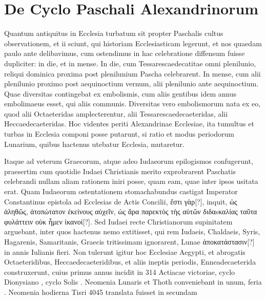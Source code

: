 \section{De Cyclo Paschali Alexandrinorum}
%
Quantum antiquitus in Ecclesia turbatum sit propter Paschalis
cultus observationem, et ii sciunt, qui historiam Ecclesiasticam
legerunt, et nos quaedam paulo ante delibavimus, cum
ostendimus in hac celebratione diffensum fuisse dupliciter: in die, et
in mense.
In die, cum Tessarescaedecatitae omni plenilunio, reliqui
dominica proxima post plenilunium Pascha celebrarent.
In mense,
cum alii plenilunio proximo post aequinoctium vernum, alii plenilunio
ante aequinoctium.
Quae diversitas contingebat ex embolismis,
cum aliis gentibus idem annus embolimaeus esset, qui aliis communis.
Diversitas vero embolismorum nata ex eo, quod alii Octaeteridas
amplecterentur, alii Tessarescaedecaeteridas, alii Heccaedecaeteridas.
Hoc videntes periti Alexandrinae Ecclesiae, ita tumultus et
turbas in Ecclesia componi posse putarunt, si ratio et modus periodorum
Lunarium, quibus hactenus utebatur Ecclesia, mutaretur.
%
\begin{table}[tb]
  
\end{table}
%
Itaque
ad veterum Graecorum, atque adeo Iudaeorum epilogismos confugerunt,
praesertim cum quotidie Iudaei
Christianis merito exprobrarent Paschatis
celebrandi nullam aliam rationem iniri
posse, quam eam, quae inter ipsos usitata
erat.
Quam Iudaeorum ostentationem
stomachabundus castigat Imperator Constantinus
epistola ad Ecclesias de Actis
Concilii, \textgreek{ἔστι γὰρ[?]}, inquit, \textgreek{ὡς ἀληθῶς, ἀτοπώτατον
ἐκείνους αὐχεῖν, ὡς ἄρα παρεκτὸς τὴς αὐτῶν
διδαsκαλίας ταῦτα φυλάττειν οὐκ ἦμεν ἱκανοί[?]}.
Sed Iudaei recte Christianorum supinitatem
arguebant, inter quos hactenus
nemo extitisset, qui rem Iudaeis, Chaldaeis,
Syris, Hagarenis, Samaritanis, Graecis
tritissimam ignorarent, Lunae \textgreek{ἀποκατάστασιν[?]}
in  annis Iulianis fieri.
Non
tulerunt igitur hoc Ecclesiae Aegypti, et
abrogatis Octaeteridibus, Heccaedecaeteridibus,
et aliis ineptis periodis, Enneadecaeterida
construxerunt, cuius primus
annus incidit in 314 Actiacae victoriae, cyclo Dionysiano , cyclo
Solis .
Neomenia Lunaris et Thoth conveniebant in unum, feria
.
Neomenia hodierna Tisri 4045 translata fuisset in secundam %
